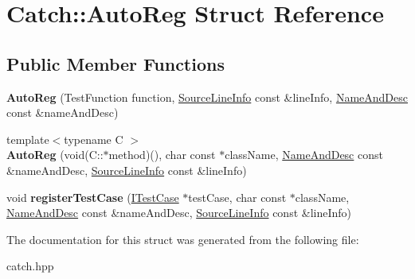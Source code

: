 \hypertarget{structCatch_1_1AutoReg}{
\section{Catch::AutoReg Struct Reference}
\label{structCatch_1_1AutoReg}
}
\subsection*{Public Member Functions}
\begin{DoxyCompactItemize}
\item 
\hypertarget{structCatch_1_1AutoReg_af224f4568d57b8652474df475a164a8c}{
{\bfseries AutoReg} (TestFunction function, \hyperlink{structCatch_1_1SourceLineInfo}{SourceLineInfo} const \&lineInfo, \hyperlink{structCatch_1_1NameAndDesc}{NameAndDesc} const \&nameAndDesc)}
\label{structCatch_1_1AutoReg_af224f4568d57b8652474df475a164a8c}

\item 
\hypertarget{structCatch_1_1AutoReg_a784510d5789c6f4df285ee811e6a0ce6}{
{\footnotesize template$<$typename C $>$ }\\{\bfseries AutoReg} (void(C::$\ast$method)(), char const $\ast$className, \hyperlink{structCatch_1_1NameAndDesc}{NameAndDesc} const \&nameAndDesc, \hyperlink{structCatch_1_1SourceLineInfo}{SourceLineInfo} const \&lineInfo)}
\label{structCatch_1_1AutoReg_a784510d5789c6f4df285ee811e6a0ce6}

\item 
\hypertarget{structCatch_1_1AutoReg_a2dc6a03e838b31e29fcd6a740195b55b}{
void {\bfseries registerTestCase} (\hyperlink{structCatch_1_1ITestCase}{ITestCase} $\ast$testCase, char const $\ast$className, \hyperlink{structCatch_1_1NameAndDesc}{NameAndDesc} const \&nameAndDesc, \hyperlink{structCatch_1_1SourceLineInfo}{SourceLineInfo} const \&lineInfo)}
\label{structCatch_1_1AutoReg_a2dc6a03e838b31e29fcd6a740195b55b}

\end{DoxyCompactItemize}


The documentation for this struct was generated from the following file:\begin{DoxyCompactItemize}
\item 
catch.hpp\end{DoxyCompactItemize}
